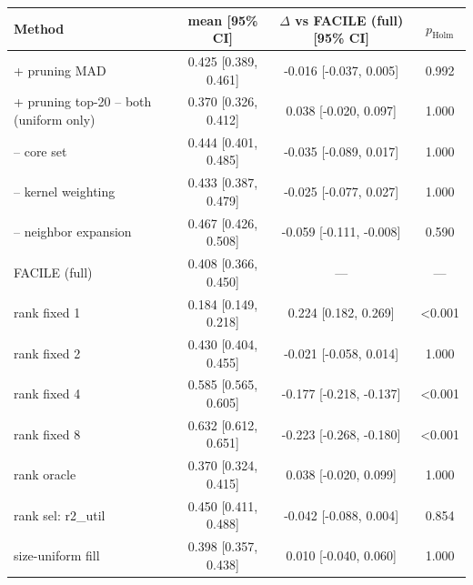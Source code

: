 \begin{tabular}{lccc}
\toprule
Method & mean [95\% CI] & $\Delta$ vs FACILE (full) [95\% CI] & $p_{\mathrm{Holm}}$ \\
\midrule
+ pruning MAD & 0.425 [0.389, 0.461] & -0.016 [-0.037, 0.005] & 0.992 \\
+ pruning top-20%
-- both (uniform only) & 0.370 [0.326, 0.412] & 0.038 [-0.020, 0.097] & 1.000 \\
-- core set & 0.444 [0.401, 0.485] & -0.035 [-0.089, 0.017] & 1.000 \\
-- kernel weighting & 0.433 [0.387, 0.479] & -0.025 [-0.077, 0.027] & 1.000 \\
-- neighbor expansion & 0.467 [0.426, 0.508] & -0.059 [-0.111, -0.008] & 0.590 \\
FACILE (full) & 0.408 [0.366, 0.450] & --- & --- \\
rank fixed 1 & 0.184 [0.149, 0.218] & 0.224 [0.182, 0.269] & <0.001 \\
rank fixed 2 & 0.430 [0.404, 0.455] & -0.021 [-0.058, 0.014] & 1.000 \\
rank fixed 4 & 0.585 [0.565, 0.605] & -0.177 [-0.218, -0.137] & <0.001 \\
rank fixed 8 & 0.632 [0.612, 0.651] & -0.223 [-0.268, -0.180] & <0.001 \\
rank oracle & 0.370 [0.324, 0.415] & 0.038 [-0.020, 0.099] & 1.000 \\
rank sel: r2_util & 0.450 [0.411, 0.488] & -0.042 [-0.088, 0.004] & 0.854 \\
size-uniform fill & 0.398 [0.357, 0.438] & 0.010 [-0.040, 0.060] & 1.000 \\
\bottomrule
\end{tabular}


